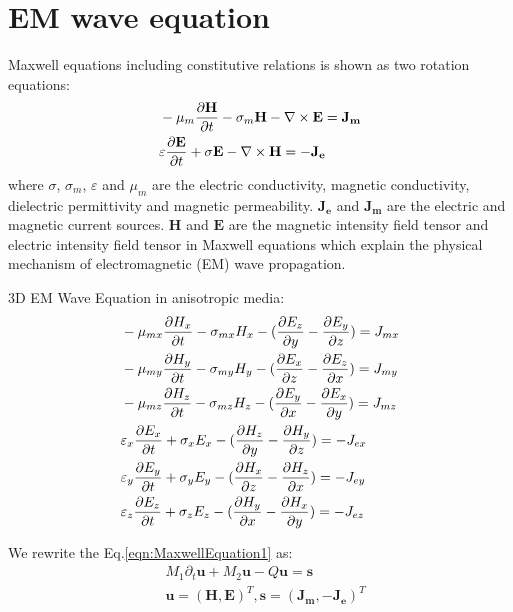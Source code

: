 \documentclass[pdftex,a4paper,parskip,listof=totoc,bibliography=totoc,onehalfspacing,12pt]{scrreprt}
\begin{document}
\section{EM wave equation}
\par Maxwell equations including constitutive relations is shown as two rotation equations: \\
\begin{equation}
\begin{aligned}
\label{eqn:MaxwellEquation}
&-\mu_{m} \pdv{ \mathbf{H}}{t} - \sigma_{m}\mathbf{H} - \nabla \times \mathbf{E} =  \mathbf{J_{m}} \\
&\varepsilon\pdv{ \mathbf{E}}{t} + \sigma\mathbf{E} -\nabla \times \mathbf{H} =  - \mathbf{J_{e}}
\end{aligned}
\end{equation}
where $\sigma$, $\sigma_{m}$, $\varepsilon$ and $\mu_{m}$ are the electric conductivity, magnetic conductivity, dielectric permittivity and magnetic permeability. $\mathbf{J_{e}}$ and $\mathbf{J_{m}}$ are the electric and magnetic current sources. $\mathbf{H}$ and $\mathbf{E}$ are the magnetic intensity field tensor and electric intensity field tensor in Maxwell equations which explain the physical mechanism of electromagnetic (EM) wave propagation.\\
\par 3D EM Wave Equation in anisotropic media:
\begin{equation}
\begin{aligned}
\label{eqn:MaxwellEquation1}
&-\mu_{mx} \pdv{H_{x}}{t} - \sigma_{mx} H_{x} - (\pdv{E_z}{y} - \pdv{E_y}{z}) = J_{mx}\\
&-\mu_{my} \pdv{H_{y}}{t} - \sigma_{my} H_{y} - (\pdv{E_x}{z} - \pdv{E_z}{x}) = J_{my}\\
&-\mu_{mz} \pdv{H_{z}}{t} - \sigma_{mz} H_{z} - (\pdv{E_y}{x} - \pdv{E_x}{y}) = J_{mz}\\
&\varepsilon_{x} \pdv{E_{x}}{t} + \sigma_{x} E_{x} - (\pdv{H_z}{y} - \pdv{H_y}{z}) = -J_{ex}\\
&\varepsilon_{y} \pdv{E_{y}}{t} + \sigma_{y} E_{y} - (\pdv{H_x}{z} - \pdv{H_z}{x}) = -J_{ey}\\
&\varepsilon_{z} \pdv{E_{z}}{t} + \sigma_{z} E_{z} - (\pdv{H_y}{x} - \pdv{H_x}{y}) = -J_{ez}
\end{aligned}
\end{equation}
\par We rewrite the Eq.\ref{eqn:MaxwellEquation1} as:
\begin{equation}
\begin{aligned}
\label{eqn:MaxwellEquationMatrix}
&M_1 \partial_{t} \mathbf{u} + M_2 \mathbf{u} - Q\mathbf{u} = \mathbf{s} \\
&\mathbf{u} = (\mathbf{H}, \mathbf{E})^T, \mathbf{s} = (\mathbf{J_{m}}, -\mathbf{J_{e}})^T \\
\end{aligned}
\end{equation}
\end{document}
